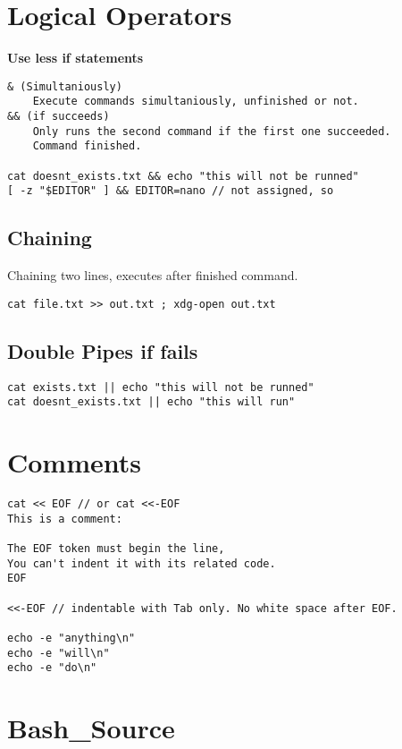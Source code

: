 \section{Logical Operators}

\textbf{Use less if statements}

\begin{verbatim}
& (Simultaniously)
    Execute commands simultaniously, unfinished or not.
&& (if succeeds)
    Only runs the second command if the first one succeeded.
    Command finished.

cat doesnt_exists.txt && echo "this will not be runned" 
[ -z "$EDITOR" ] && EDITOR=nano // not assigned, so
\end{verbatim}

\subsection{Chaining}
Chaining two lines, executes after finished command.

\begin{verbatim}
cat file.txt >> out.txt ; xdg-open out.txt 
\end{verbatim}

\subsection{Double Pipes if fails}

\begin{verbatim}
cat exists.txt || echo "this will not be runned" 
cat doesnt_exists.txt || echo "this will run" 
\end{verbatim}

\section{Comments}

\begin{verbatim}
cat << EOF // or cat <<-EOF
This is a comment:

The EOF token must begin the line,
You can't indent it with its related code. 
EOF

<<-EOF // indentable with Tab only. No white space after EOF.

echo -e "anything\n"
echo -e "will\n"
echo -e "do\n"
\end{verbatim}

\section{Bash\_Source}

